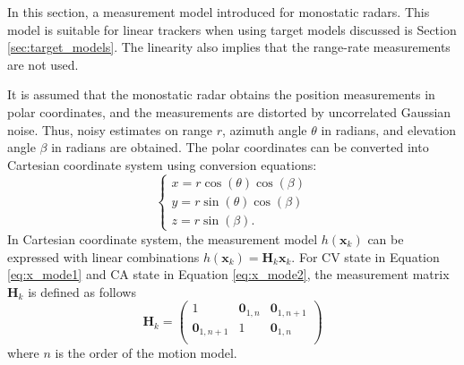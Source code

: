 \documentclass[english, 12pt, a4paper, elec, utf8, a-1b, online]{aaltothesis}
\renewcommand{\vec}[1]{\mathbf{#1}}
\newcommand{\x}{\vec{x}_k}
\newcommand{\omodel}{\vec{H}_k}
\begin{document}
In this section, a measurement model introduced for monostatic radars.
This model is suitable for linear trackers when using target models discussed is Section \ref{sec:target_models}.
The linearity also implies that the range-rate measurements are not used.

It is assumed that the monostatic radar obtains the position measurements in polar coordinates, and the measurements are distorted by uncorrelated Gaussian noise.
Thus, noisy estimates on range $r$, azimuth angle $\theta$ in radians, and elevation angle $\beta$ in radians are obtained.
The polar coordinates can be converted into Cartesian coordinate system using conversion equations:
\begin{equation}
\left\{
\begin{array}{l}
    x = r \cos(\theta) \cos(\beta) \\
    y = r \sin(\theta) \cos(\beta) \\
    z = r \sin(\beta).
\end{array}\right.
\end{equation}
In Cartesian coordinate system, the measurement model $h(\x)$ can be expressed with linear combinations $h(\x) = \omodel \x$.
For CV state in Equation \eqref{eq:x_mode1} and CA state in Equation \eqref{eq:x_mode2}, the measurement matrix $\omodel$ is defined as follows
\begin{equation}\label{eq:position_measurement_matrix}
    \omodel = 
       \begin{pmatrix}
            1 & \vec{0}_{1, n} & \vec{0}_{1, n+1}\\ 
            \vec{0}_{1, n+1} & 1 & \vec{0}_{1, n}\\ 
        \end{pmatrix}
\end{equation}
where $n$ is the order of the motion model.
\end{document}
